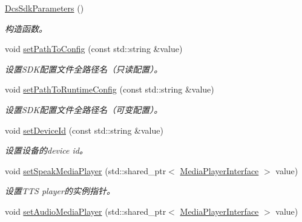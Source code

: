 \begin{DoxyCompactItemize}
\item 
\mbox{\label{structduerOSDcsSDK_1_1sdkInterfaces_1_1DcsSdkParameters_a4f7783b647c950318c10ba951f1a99e9}} 
\hyperlink{structduerOSDcsSDK_1_1sdkInterfaces_1_1DcsSdkParameters_a4f7783b647c950318c10ba951f1a99e9}{Dcs\+Sdk\+Parameters} ()
\begin{DoxyCompactList}\small\item\em 构造函数。 \end{DoxyCompactList}\item 
void \hyperlink{structduerOSDcsSDK_1_1sdkInterfaces_1_1DcsSdkParameters_a95c8300f4163e33cc6d639900afe1a6d}{set\+Path\+To\+Config} (const std\+::string \&value)
\begin{DoxyCompactList}\small\item\em 设置\+S\+D\+K配置文件全路径名（只读配置）。 \end{DoxyCompactList}\item 
void \hyperlink{structduerOSDcsSDK_1_1sdkInterfaces_1_1DcsSdkParameters_ab62fb7501f438a401592b2a1c4ef1548}{set\+Path\+To\+Runtime\+Config} (const std\+::string \&value)
\begin{DoxyCompactList}\small\item\em 设置\+S\+D\+K配置文件全路径名（可变配置）。 \end{DoxyCompactList}\item 
void \hyperlink{structduerOSDcsSDK_1_1sdkInterfaces_1_1DcsSdkParameters_a560bb54f6250f35c976d32abc69f8879}{set\+Device\+Id} (const std\+::string \&value)
\begin{DoxyCompactList}\small\item\em 设置设备的device id。 \end{DoxyCompactList}\item 
void \hyperlink{structduerOSDcsSDK_1_1sdkInterfaces_1_1DcsSdkParameters_a5f35981ec0f7f048c658dd5778c877af}{set\+Speak\+Media\+Player} (std\+::shared\+\_\+ptr$<$ \hyperlink{classduerOSDcsSDK_1_1sdkInterfaces_1_1MediaPlayerInterface}{Media\+Player\+Interface} $>$ value)
\begin{DoxyCompactList}\small\item\em 设置\+T\+TS player的实例指针。 \end{DoxyCompactList}\item 
void \hyperlink{structduerOSDcsSDK_1_1sdkInterfaces_1_1DcsSdkParameters_ac9b35322064082a043a10c50631dfbab}{set\+Audio\+Media\+Player} (std\+::shared\+\_\+ptr$<$ \hyperlink{classduerOSDcsSDK_1_1sdkInterfaces_1_1MediaPlayerInterface}{Media\+Player\+Interface} $>$ value)

\end{DoxyCompactItemize}
